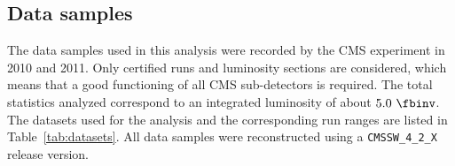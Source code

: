 \subsection{Data samples}
The data samples used in this analysis were recorded by the CMS experiment in 2010 and 2011.
Only certified runs and luminosity sections are considered, which means that a good functioning
of all CMS sub-detectors is required. The total statistics analyzed correspond to an integrated
luminosity of about $5.0~\fbinv$.
The datasets used for the analysis and the corresponding run ranges are listed in Table~\ref{tab:datasets}.
All data samples were reconstructed using a \texttt{CMSSW\_4\_2\_X} release version.
